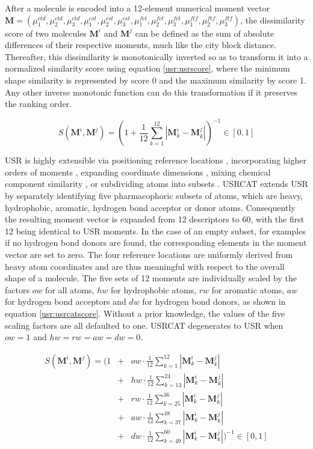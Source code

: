 After a molecule is encoded into a 12-element numerical moment vector $\mathbf M=(\mu_1^{ctd}, \mu_2^{ctd}, \mu_3^{ctd}, \mu_1^{cst}, \mu_2^{cst}, \mu_3^{cst}, \mu_1^{fct}, \mu_2^{fct}, \mu_3^{fct}, \mu_1^{ftf}, \mu_2^{ftf}, \mu_3^{ftf})$, the dissimilarity score of two molecules $\mathbf M^i$ and $\mathbf M^j$ can be defined as the sum of absolute differences of their respective moments, much like the city block distance. Thereafter, this dissimilarity is monotonically inverted so as to transform it into a normalized similarity score using equation \eqref{usr:usrscore}, where the minimum shape similarity is represented by score 0 and the maximum similarity by score 1. Any other inverse monotonic function can do this transformation if it preserves the ranking order.

\begin{equation}
S(\mathbf M^i, \mathbf M^j)=(1+\frac{1}{12}\sum_{k=1}^{12}|\mathbf M_k^i-\mathbf M_k^j|)^{-1}\in[0, 1]
\label{usr:usrscore}
\end{equation}

USR \citep{1379} is highly extensible via positioning reference locations \citep{1334,1335}, incorporating higher orders of moments \citep{1333,1337}, expanding coordinate dimensions \citep{1337,1338}, mixing chemical component similarity \citep{1333,1407,1408}, or subdividing atoms into subsets \citep{1436,1331}. USRCAT \citep{1331} extends USR \citep{1379} by separately identifying five pharmacophoric subsets of atoms, which are heavy, hydrophobic, aromatic, hydrogen bond acceptor or donor atoms. Consequently the resulting moment vector is expanded from 12 descriptors to 60, with the first 12 being identical to USR moments. In the case of an empty subset, for examples if no hydrogen bond donors are found, the corresponding elements in the moment vector are set to zero. The four reference locations are uniformly derived from heavy atom coordinates and are thus meaningful with respect to the overall shape of a molecule. The five sets of 12 moments are individually scaled by the factors $ow$ for all atoms, $hw$ for hydrophobic atoms, $rw$ for aromatic atoms, $aw$ for hydrogen bond acceptors and $dw$ for hydrogen bond donors, as shown in equation \eqref{usr:usrcatscore}. Without a prior knowledge, the values of the five scaling factors are all defaulted to one. USRCAT degenerates to USR when $ow=1$ and $hw=rw=aw=dw=0$.

\begin{eqnarray}
S(\mathbf M^i, \mathbf M^j)=(1
&+&ow\cdot\frac{1}{12}\sum_{k= 1}^{12}|\mathbf M_k^i-\mathbf M_k^j|\nonumber\\
&+&hw\cdot\frac{1}{12}\sum_{k=13}^{24}|\mathbf M_k^i-\mathbf M_k^j|\nonumber\\
&+&rw\cdot\frac{1}{12}\sum_{k=25}^{36}|\mathbf M_k^i-\mathbf M_k^j|\nonumber\\
&+&aw\cdot\frac{1}{12}\sum_{k=37}^{48}|\mathbf M_k^i-\mathbf M_k^j|\nonumber\\
&+&dw\cdot\frac{1}{12}\sum_{k=49}^{60}|\mathbf M_k^i-\mathbf M_k^j|)^{-1}\in[0, 1]
\label{usr:usrcatscore}
\end{eqnarray}

